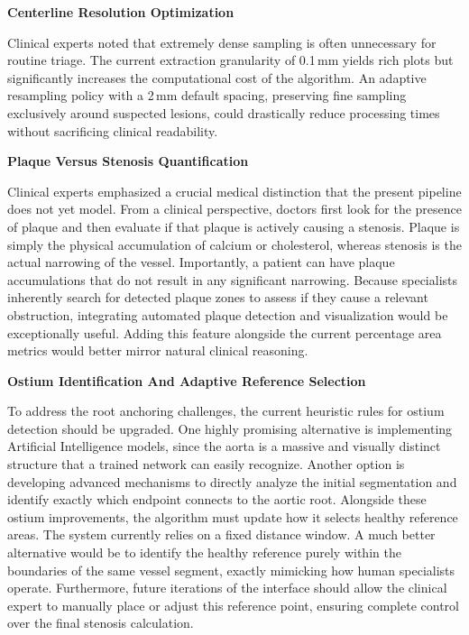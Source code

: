\vspace{0.75em}
\noindent\textbf{Centerline Resolution Optimization}\par
\vspace{0.4em}
\noindent
Clinical experts noted that extremely dense sampling is often unnecessary for routine triage. The current extraction granularity of 0.1\,mm yields rich plots but significantly increases the computational cost of the algorithm. An adaptive resampling policy with a 2\,mm default spacing, preserving fine sampling exclusively around suspected lesions, could drastically reduce processing times without sacrificing clinical readability.

\vspace{0.75em}
\noindent\textbf{Plaque Versus Stenosis Quantification}\par
\vspace{0.4em}
\noindent
Clinical experts emphasized a crucial medical distinction that the present pipeline does not yet model. From a clinical perspective, doctors first look for the presence of plaque and then evaluate if that plaque is actively causing a stenosis. Plaque is simply the physical accumulation of calcium or cholesterol, whereas stenosis is the actual narrowing of the vessel. Importantly, a patient can have plaque accumulations that do not result in any significant narrowing. Because specialists inherently search for detected plaque zones to assess if they cause a relevant obstruction, integrating automated plaque detection and visualization would be exceptionally useful. Adding this feature alongside the current percentage area metrics would better mirror natural clinical reasoning.

\vspace{0.75em}
\noindent\textbf{Ostium Identification And Adaptive Reference Selection}\par
\vspace{0.4em}
\noindent
To address the root anchoring challenges, the current heuristic rules for ostium detection should be upgraded. One highly promising alternative is implementing Artificial Intelligence models, since the aorta is a massive and visually distinct structure that a trained network can easily recognize. Another option is developing advanced mechanisms to directly analyze the initial segmentation and identify exactly which endpoint connects to the aortic root. Alongside these ostium improvements, the algorithm must update how it selects healthy reference areas. The system currently relies on a fixed distance window. A much better alternative would be to identify the healthy reference purely within the boundaries of the same vessel segment, exactly mimicking how human specialists operate. Furthermore, future iterations of the interface should allow the clinical expert to manually place or adjust this reference point, ensuring complete control over the final stenosis calculation.

